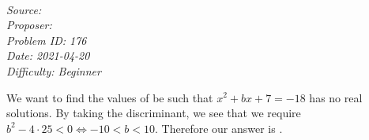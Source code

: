 
\SSbreak\\
\emph{Source: \Cfolk}\\
\emph{Proposer: \Pss}\\
\emph{Problem ID: 176}\\
\emph{Date: 2021-04-20}\\
\emph{Difficulty: Beginner}\\
\SSbreak
 
\bigskip

\begin{solution}\hfil\medskip

    We want to find the values of be such that \(x^2+bx+7=-18\) has no real solutions. By taking the discriminant, we see that we require \(b^2-4\cdot25<0\iff -10<b<10\). Therefore our answer is .

\end{solution}\bigskip
